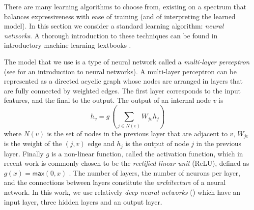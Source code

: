 There are many learning algorithms to choose from, existing on a spectrum that
balances expressiveness with ease of training (and of interpreting the learned
model). In this section we consider a standard learning algorithm: \emph{neural
networks}. A thorough introduction to these techniques can be found in
introductory machine learning textbooks \citep[\eg][]{Hastie2009-bn}.



The model that we use is a type of neural network called a \emph{multi-layer
perceptron} (see \citep{Nielsen2015-pu} for an introduction to neural networks).
A multi-layer perceptron can be represented as a directed acyclic graph whose
nodes are arranged in layers that are fully connected by weighted edges. The
first layer corresponds to the input features, and the final to the output. The
output of an internal node $v$ is
\[ h_v = g\,(\sum_{j \in N(v)}\!W_{jv} h_j ) \] where $N(v)$ is the set of nodes
in the previous layer that are adjacent to $v$, $W_{jv}$ is the weight of the
$(j, v)$ edge and $h_j$ is the output of node $j$ in the previous layer. Finally
$g$ is a non-linear function, called the activation function, which in recent
work is commonly chosen to be the \emph{rectified linear unit} (ReLU), defined
as $g(x) = \mathsf{max}(0,x)$ \citep{Nair2010-xg}. The number of layers, the
number of neurons per layer, and the connections between layers constitute the
\emph{architecture} of a neural network. In this work, we use relatively
\emph{deep neural networks} (\dnn) which have an input layer, three hidden layers and
an output layer.


